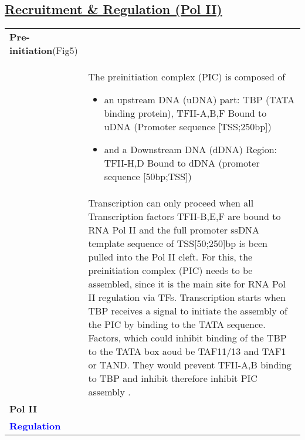 {\subsection{\underline{Recruitment \& Regulation (Pol II)} }

\begin{longtable}{p{1in}p{4.8in}}
\textbf{Pre-initiation}(Fig5) & \\
& The preinitiation complex (PIC) is composed of 
\begin{itemize}
    \item an upstream DNA (uDNA) part: TBP (TATA binding protein), TFII-A,B,F Bound to uDNA (Promoter sequence [TSS;250bp])
    \item and a Downstream DNA (dDNA) Region:   TFII-H,D Bound to dDNA (promoter sequence [50bp;TSS])
\end{itemize}\\
& Transcription can only proceed when all Transcription factors TFII-B,E,F  are bound to RNA Pol II  and the full  promoter ssDNA template sequence of TSS[50;250]bp is been pulled into the Pol II cleft. For this, the preinitiation complex (PIC) needs to be assembled, since it is the main site for RNA Pol II regulation via TFs. Transcription starts when TBP receives a signal to initiate the assembly of the PIC by binding to the TATA sequence. Factors, which could inhibit binding of the TBP to the TATA box aoud be TAF11/13 and TAF1 or TAND. They would prevent TFII-A,B binding to TBP and inhibit therefore inhibit PIC assembly \citep[p.466]{pol2}.   \\
\textbf{Pol II} & \\ 
%
\textbf{\textcolor{blue}{Regulation}} &
%
\\
\end{longtable}


}
\endinput